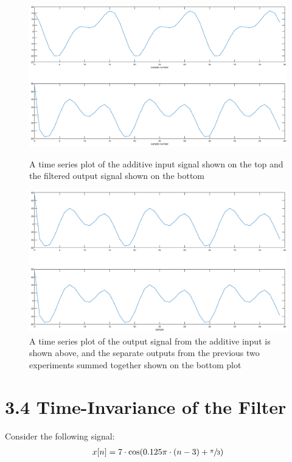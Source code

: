 \documentclass{article}
\begin{document}
\begin{figure}[H]
	\centering
	\begin{minipage}[t]{0.4\linewidth}
		\includegraphics[scale=0.15]{fig6}
		\caption{A time series plot of the additive input signal shown on the top and the filtered output signal shown on the bottom}
	\end{minipage}
	\hspace{2cm}
	\begin{minipage}[t]{0.4\linewidth}
		\includegraphics[scale=0.15]{fig7}
		\caption{A time series plot of the output signal from the additive input is shown above, and the separate outputs from the previous two experiments summed together shown on the bottom plot}
	\end{minipage}
\end{figure}

\section{3.4 Time-Invariance of the Filter}

Consider the following signal:
\begin{align*}
	x[n] = 7 \cdot \cos(0.125 \pi \cdot (n - 3) + \sfrac{\pi}{3})
\end{align*}
\end{document}
